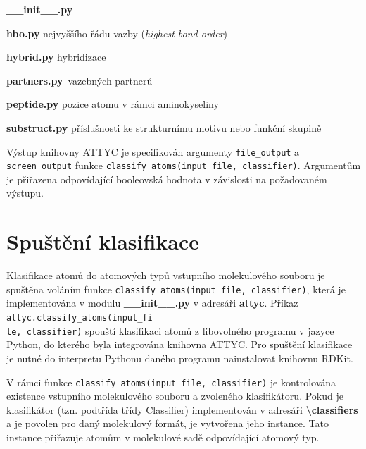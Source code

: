 \medskip
\textbf{\_\_init\_\_.py}

\vspace{0.01cm}
\textbf{hbo.py} nejvyššího řádu vazby (\textit{highest bond order})

\vspace{0.01cm}
\textbf{hybrid.py} hybridizace

\vspace{0.01cm}
\textbf{partners.py}\ vazebných partnerů

\vspace{0.01cm}
\textbf{peptide.py} pozice atomu v rámci aminokyseliny
    
\vspace{0.01cm}
\textbf{substruct.py} příslušnosti ke strukturnímu motivu nebo funkční skupině

\bigskip
Výstup knihovny ATTYC je specifikován argumenty \verb|file_output| a \verb|screen_output| funkce \verb|classify_atoms(input_file, classifier)|. 
Argumentům je přiřazena odpovídající booleovská hodnota v závislosti na požadovaném výstupu.

\section{Spuštění klasifikace}
Klasifikace atomů do atomových typů vstupního molekulového souboru je spuštěna voláním fun\-kce \verb|classify_atoms(input_file, classifier)|, která je 
implementována v modulu \textbf{\_\_init\_\_.py} v adresáři \textbf{attyc}. Příkaz \verb|attyc.classify_atoms(input_fi|\\ \verb|le, classifier)| spouští klasifikaci atomů z libovolného programu v jazyce Python, do kterého byla integrována knihovna ATTYC. Pro spuštění klasifikace je nutné do interpretu Pythonu daného programu nainstalovat knihovnu RDKit. 

V rámci funkce \verb|classify_atoms(input_file, classifier)| je kontrolována e\-xistence vstupního molekulového souboru a zvoleného klasifikátoru. Pokud je klasifikátor (tzn. podtřída třídy Classifier) implementován v adresáři \textbf{\textbackslash classifiers} a je povolen pro daný molekulový formát, je vytvořena jeho instance. Tato instance přiřazuje atomům v molekulové sadě odpovídající atomový typ.

